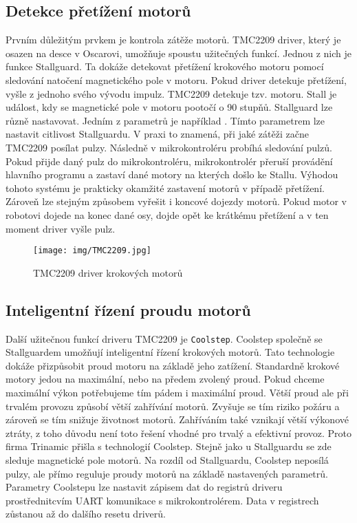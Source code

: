 \subsection{Detekce přetížení motorů}
Prvním důležitým prvkem je kontrola zátěže motorů. TMC2209 driver, který je osazen na desce v Oscarovi, umožňuje spoustu užitečných funkcí. Jednou z nich je funkce Stallguard. Ta dokáže detekovat přetížení krokového motoru pomocí sledování natočení magnetického pole v motoru. Pokud driver detekuje přetížení, vyšle z jednoho svého vývodu impulz. TMC2209 detekuje tzv.  motoru. Stall je událost, kdy se magnetické pole v motoru pootočí o 90 stupňů. Stallguard lze různě nastavovat. Jedním z parametrů je například . Tímto parametrem lze nastavit citlivost Stallguardu. V praxi to znamená, při jaké zátěži začne TMC2209 posílat pulzy. Následně v mikrokontroléru probíhá sledování pulzů. Pokud přijde daný pulz do mikrokontroléru, mikrokontrolér přeruší provádění hlavního programu a zastaví dané motory na kterých došlo ke Stallu. Výhodou tohoto systému je prakticky okamžité zastavení motorů v případě přetížení. Zároveň lze stejným způsobem vyřešit i koncové dojezdy motorů. Pokud motor v robotovi dojede na konec dané osy, dojde opět ke krátkému přetížení a v ten moment driver vyšle pulz. \cite{BIGTREETECH-TMC2209} \cite{TMC2209} 

\begin{figure}
		\begin{center}
			\texttt{[image: img/TMC2209.jpg]}
			\caption{TMC2209 driver krokových motorů \cite{BIGTREETECH-TMC2209}}
			\label{fig:TMC2209}
		\end{center}
		\vspace{0mm}
\end{figure}

\subsection{Inteligentní řízení proudu motorů}
Další užitečnou funkcí driveru TMC2209 je \texttt{Coolstep}. Coolstep společně se Stallguardem umožňují inteligentní řízení krokových motorů. Tato technologie dokáže přizpůsobit proud motoru na základě jeho zatížení. Standardně krokové motory jedou na maximální, nebo na předem zvolený proud.
Pokud chceme maximální výkon potřebujeme tím pádem i maximální proud. Větší proud ale při trvalém provozu způsobí větší zahřívání motorů. Zvyšuje se tím riziko požáru a zároveň se tím snižuje životnost motorů. Zahříváním také vznikají větší výkonové ztráty, z toho důvodu není toto řešení vhodné pro trvalý a efektivní provoz. Proto firma Trinamic přišla s technologií Coolstep. Stejně jako u Stallguardu se zde sleduje magnetické pole motorů. Na rozdíl od Stallguardu, Coolstep neposílá pulzy, ale přímo reguluje proudy motorů na základě nastavených parametrů. Parametry Coolstepu lze nastavit zápisem dat do registrů driveru prostřednitcvím UART komunikace s mikrokontrolérem. Data v registrech zůstanou až do dalšího resetu driverů. \cite{TMC2209}

